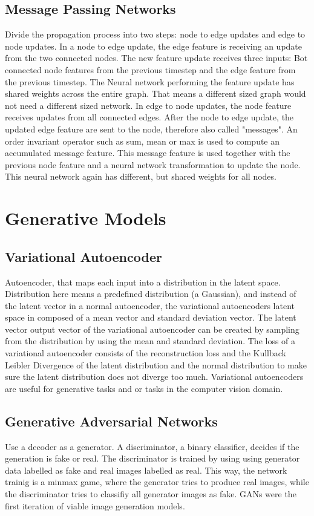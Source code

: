 \documentclass{scrartcl}
\begin{document}
\subsection*{Message Passing Networks}
Divide the propagation process into two steps: node to edge updates and edge to node updates.
In a node to edge update, the edge feature is receiving an update from the two connected nodes. The new feature update receives three inputs: Bot connected node features from the previous timestep and the edge feature from the previous timestep. The Neural network performing the feature update has shared weights across the entire graph. That means a different sized graph would not need a different sized network.
In edge to node updates, the node feature receives updates from all connected edges. After the node to edge update, the updated edge feature are sent to the node, therefore also called "messages". An order invariant operator such as sum, mean or max is used to compute an accumulated message feature. This message feature is used together with the previous node feature and a neural network transformation to update the node. This neural network again has different, but shared weights for all nodes.


\section*{Generative Models}
\subsection*{Variational Autoencoder}
Autoencoder, that maps each input into a distribution in the latent space. Distribution here means a predefined distribution (a Gaussian), and instead of the latent vector in a normal autoencoder, the variational autoencoders latent space in composed of a mean vector and standard deviation vector. The latent vector output vector of the variational autoencoder can be created by sampling from the distribution by using the mean and standard deviation.
The loss of a variational autoencoder consists of the reconstruction loss and the Kullback Leibler Divergence of the latent distribution and the normal distribution to make sure the latent distribution does not diverge too much.
Variational autoencoders are useful for generative tasks and or tasks in the computer vision domain.


\subsection*{Generative Adversarial Networks}
Use a decoder as a generator. A discriminator, a binary classifier, decides if the generation is fake or real. The discriminator is trained by using using generator data labelled as fake and real images labelled as real. This way, the network trainig is a minmax game, where the generator tries to produce real images, while the discriminator tries to classifiy all generator images as fake.
GANs were the first iteration of viable image generation models.
\end{document}
